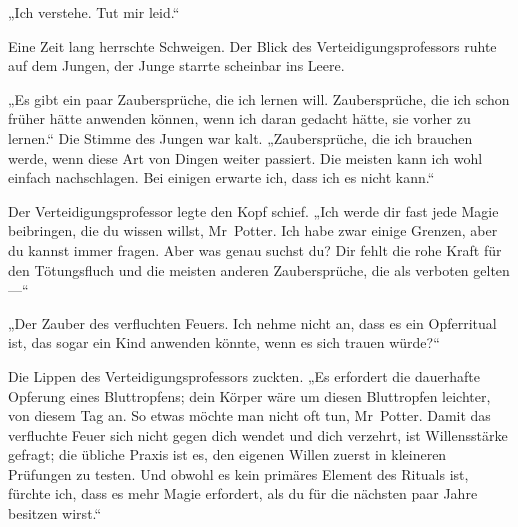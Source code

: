„Ich verstehe. Tut mir leid.“

Eine Zeit lang herrschte Schweigen. Der Blick des Verteidigungsprofessors ruhte auf dem Jungen, der Junge starrte scheinbar ins Leere.

„Es gibt ein paar Zaubersprüche, die ich lernen will. Zaubersprüche, die ich schon früher hätte anwenden können, wenn ich daran gedacht hätte, sie vorher zu lernen.“ Die Stimme des Jungen war kalt.
„Zaubersprüche, die ich brauchen werde, wenn diese Art von Dingen weiter passiert. Die meisten kann ich wohl einfach nachschlagen. Bei einigen erwarte ich, dass ich es nicht kann.“

Der Verteidigungsprofessor legte den Kopf schief.
„Ich werde dir fast jede Magie beibringen, die du wissen willst, Mr~Potter. Ich habe zwar einige Grenzen, aber du kannst immer fragen. Aber was genau suchst du? Dir fehlt die rohe Kraft für den Tötungsfluch und die meisten anderen Zaubersprüche, die als verboten gelten —“

„Der Zauber des verfluchten Feuers. Ich nehme nicht an, dass es ein Opferritual ist, das sogar ein Kind anwenden könnte, wenn es sich trauen würde?“

Die Lippen des Verteidigungsprofessors zuckten.
„Es erfordert die dauerhafte Opferung eines Bluttropfens; dein Körper wäre um diesen Bluttropfen leichter, von diesem Tag an. So etwas möchte man nicht oft tun, Mr~Potter. Damit das verfluchte Feuer sich nicht gegen dich wendet und dich verzehrt, ist Willensstärke gefragt; die übliche Praxis ist es, den eigenen Willen zuerst in kleineren Prüfungen zu testen. Und obwohl es kein primäres Element des Rituals ist, fürchte ich, dass es mehr Magie erfordert, als du für die nächsten paar Jahre besitzen wirst.“

